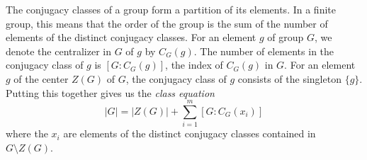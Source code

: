 \documentclass[12pt]{article}
\begin{document}
The conjugacy classes of a group form a partition of its elements.
In a finite group, this means that the order of the group is
the sum of the number of elements of the distinct conjugacy classes.
For an element $g$ of group $G$,
we denote the centralizer in $G$ of $g$ by $C_G(g)$.
The number of elements in the conjugacy class of $g$ is $[G:C_G(g)]$,
the index of $C_G(g)$ in $G$.
For an element $g$ of the center $Z(G)$ of $G$,
the conjugacy class of $g$ consists of the singleton $\{g\}$.
Putting this together gives us the \emph{class equation}
\[
  |G| = |Z(G)| + \sum_{i=1}^m [G:C_G(x_i)]
\]
where the $x_i$ are elements of
the distinct conjugacy classes contained in $G\setminus Z(G)$.
\end{document}
